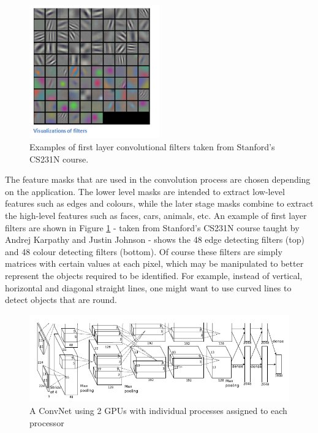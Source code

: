 \documentclass[fleqn,twoside]{article}
\begin{document}
\begin{figure}
	\begin{center}
		\includegraphics[width=0.5\textwidth]{conv_filters.png}
	\end{center}
	\caption{Examples of first layer convolutional filters taken from Stanford's CS231N course.}
	\label{fig:conv_filters}
\end{figure} 

The feature masks that are used in the convolution process are chosen depending on the application. The lower level masks are intended to extract low-level features such as edges and colours, while the later stage masks combine to extract the high-level features such as faces, cars, animals, etc. An example of first layer filters are shown in Figure \ref{fig:conv_filters} - taken from Stanford's CS231N course taught by Andrej Karpathy and Justin Johnson \cite{andrej} - shows the 48 edge detecting filters (top) and 48 colour detecting filters (bottom). Of course these filters are simply matrices with certain values at each pixel, which may be manipulated to better represent the objects required to be identified. For example, instead of vertical, horizontal and diagonal straight lines, one might want to use curved lines to detect objects that are round.

\quad
\begin{figure}[h]
	\centering
	\includegraphics[width=0.9\linewidth]{convnet1.png}
	\caption{A ConvNet using 2 GPUs with individual processes assigned to each processor}
	\label{fig:convnet1}
\end{figure}%
\end{document}
